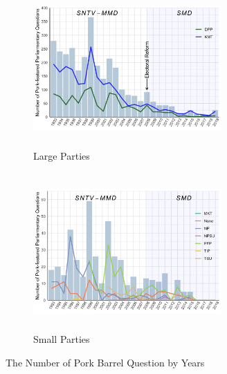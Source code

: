 \begin{figure}[ht]
    \centering
    \begin{subfigure}[t]{0.48\textwidth}
    \centering\includegraphics[width=7.2cm, height=6cm]{03-Chapter-Three/image/bigpq.png}
    \caption{Large Parties}
    \label{fig:sumporkbig}
    \end{subfigure}
    \begin{subfigure}[t]{0.48\textwidth}
    \centering\includegraphics[width=7.2cm, height=6cm]{03-Chapter-Three/image/smallpq.png}
    \caption{Small Parties}
    \label{fig:sumporksmall}    
    \end{subfigure}
    \caption{The Number of Pork Barrel Question by Years}
    \label{fig:sumpork}    
\end{figure}
